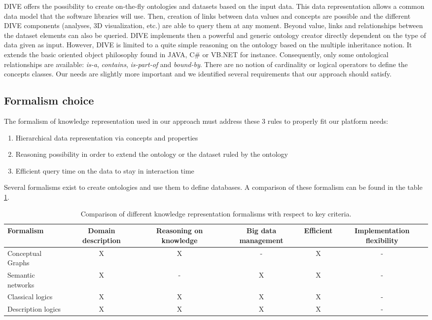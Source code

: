 \documentclass{vgtc}                          %
\begin{document}
DIVE offers the possibility to create on-the-fly ontologies and datasets based on the input data. This data representation allows a common data model that the software libraries will use. Then, creation of links between data values and concepts are possible and the different DIVE components (analyses, 3D visualization, etc.) are able to query them at any moment. Beyond value, links and relationships between the dataset elements can also be queried. DIVE implements then a powerful and generic ontology creator directly dependent on the type of data given as input. However, DIVE is limited to a quite simple reasoning on the ontology based on the multiple inheritance notion. It extends the basic oriented object philosophy found in JAVA, C\# or VB.NET for instance. Consequently, only some ontological relationships are available: \textit{is-a}, \textit{contains}, \textit{is-part-of} and \textit{bound-by}. There are no notion of cardinality or logical operators to define the concepts classes. Our needs are slightly more important and we identified several requirements that our approach should satisfy.


\subsection{Formalism choice}

The formalism of knowledge representation used in our approach must address these 3 rules to properly fit our platform needs:

\begin{enumerate}
  \item Hierarchical data representation via concepts and properties
  \item Reasoning possibility in order to extend the ontology or the dataset ruled by the ontology
  \item Efficient query time on the data to stay in interaction time
\end{enumerate}

Several formalisms exist to create ontologies and use them to define databases. A comparison of these formalism can be found in the table \ref{formalisms_comparison}.

\begin{table}[t]
\begin{tabular}{l|*{5}{c|}}
Formalism          & Domain description & Reasoning on knowledge & Big data management & Efficient & Implementation flexibility \\
\hline
Conceptual Graphs  & X & X & - & X & -  \\
Semantic networks  & X & - & X & X & -  \\
Classical logics   & X & X & X & X & -  \\
Description logics & X & X & X & X & -  \\
\end{tabular}
\caption{Comparison of different knowledge representation formalisms with respect to key criteria.}
  \label{formalisms_comparison}
\end{table}
\end{document}
